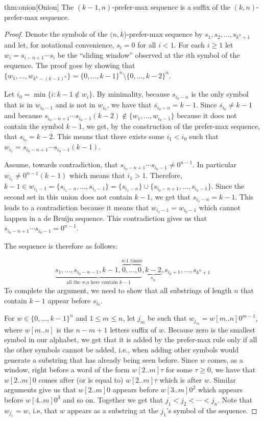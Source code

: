 \documentclass{article} %
\theoremstyle{definition} \newtheorem{definition}[theorem]{Definition}
\begin{document}
	
	\begin{repeatedtheorem}{thm:onion}[Onion] 
		The $(k-1,n)$-prefer-max sequence is a suffix of the $(k,n)$-prefer-max sequence. 
	\end{repeatedtheorem}
	\begin{proof} Denote the symbols of the $(n,k$)-prefer-max sequence by
		$s_1,s_2,\dots,s_{k^n+1}$ and let, for notational convenience, $s_i=0$ for all
		$i<1$.  For each $i\geq 1$ let $w_i=s_{i-n+1}\cdots s_i$ be the ``sliding
		window'' observed at the $i$th symbol of the sequence. The proof goes by
		showing that $\{w_1,\dots,w_{k^n-(k-1)^n}\} = \{0,\dots,k-1\}^n \setminus
		\{0,\dots,k-2\}^n$.
		
		Let ${i_0} = \min\{i\colon k-1 \notin w_i\}$. By minimality, because
		$s_{{i_0}-n}$ is the only symbol that is in $w_{i_0-1}$ and is not in
		$w_{i_0}$, we have that $s_{{i_0}-n}=k-1$. Since $s_{i_0} \neq k-1$ and
		because $s_{{i_0}-n+1}\cdots s_{{i_0}-1} (k-2) \notin \{w_1,\dots,w_{i_0-1}\}$
		because it does not contain the symbol $k-1$, we get, by the construction of
		the prefer-max sequence, that $s_{{i_0}}=k-2$. This means that there exists
		some ${i_1}<{i_0}$ such that $w_{i_1} = s_{{i_0}-n+1}\cdots s_{{i_0}-1}(k-1)$.
		
		Assume, towards contradiction, that $s_{{i_0}-n+1}\cdots s_{{i_0}-1} \neq
		0^{n-1}$. In particular $w_{i_1} \neq 0^{n-1}(k-1)$ which means that ${i_1} >
		1$. Therefore, $k-1  \in w_{i_1-1}=
		\{s_{{i_1}-n},\dots,s_{{i_1}-1}\}=\{s_{{i_1}-n}\} \cup
		\{s_{{i_0}-n+1},\dots,s_{{i_0}-1}\}$. Since the second set in this union does
		not contain $k-1$, we get that $s_{{i_1}-n}=k-1$. This leads to a
		contradiction because it means that $w_{{i_1}-1} = w_{{i_0}-1}$ which cannot
		happen in a de Bruijn sequence. This contradiction gives us that
		$s_{{i_0}-n+1}\cdots s_{{i_0}-1} = 0^{n-1}$.
		
		The sequence is therefore as follows:
				
		$$\underbrace{s_1,\dots,s_{i_0-n-1},k-1,\overbrace{0,\dots,0}^\text{$n\text{-}1$ times}}_{\text{all the $w_i$s here contain $k-1$}},\underbrace{k-2}_{s_{i_0}},s_{i_0+1},\dots,s_{k^n+1}$$ To complete the argument, we need to show that all substrings of length $n$ that contain $k-1$ appear before $s_{i_0}$.
		
		For $w \in \{0,\dots,k-1\}^n$ and $1 \leq m \leq n$, let $j_m$ be such that
		$w_{j_m} = w[m..n]0^{m-1}$, where $w[m..n]$ is the $n-m+1$ letters suffix of
		$w$. Because zero is the smallest symbol in our alphabet, we get that it is
		added by the prefer-max rule only if all the other symbols cannot be added,
		i.e., when adding other symbols would generate a substring that has already
		being seen before. Since $w$ comes, as a window, right before a word of the
		form $w[2..m]\tau$ for some $\tau \geq 0$, we have that $w[2..m]0$ comes after
		(or is equal to) $w[2..m]\tau$ which is after $w$. Similar arguments give us
		that $w[2..m]0$ appears before $w[3..m]0^2$ which appears before $w[4..m]0^3$
		and so on. Together we get that $j_1 < j_2 < \cdots < j_n$. Note that
		$w_{j_1}=w$, i.e, that $w$ appears as a substring at the $j_1$'s symbol of the
		sequence.
		

\end{proof}
\end{document}
